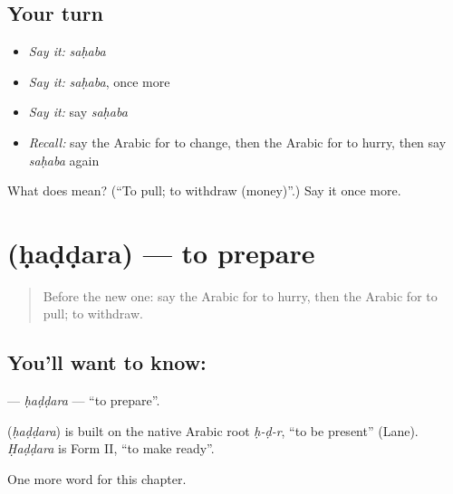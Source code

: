 \subsection*{Your turn}
\begin{itemize}
\raggedright
  \item \emph{Say it:} \emph{saḥaba}
  \item \emph{Say it:} \emph{saḥaba}, once more
  \item \emph{Say it:} say \emph{saḥaba}
  \item \emph{Recall:} say the Arabic for to change, then the Arabic for to hurry, then say \emph{saḥaba} again
\end{itemize}

\begin{tcolorbox}[breakable,colback=teal!4,colframe=teal!35!black,title={Before you move on}]
What does  mean? (\textquotedblleft{}To pull; to withdraw (money)\textquotedblright{}.) Say it once more.
\end{tcolorbox}
\section[\texorpdfstring{\ar{حضر} (ḥaḍḍara)}{حضر (ḥaḍḍara)}]{ (ḥaḍḍara) — to prepare}

\label{lesson:AR-C225-haddara}



\begin{quote}
Before the new one: say the Arabic for to hurry, then the Arabic for to pull; to withdraw.
\end{quote}

\subsection*{You'll want to know: }
\textbf{} — \emph{ḥaḍḍara} — \textquotedblleft{}to prepare\textquotedblright{}.

\begin{cousinweb}
\textbf{} (\emph{ḥaḍḍara}) is built on the native Arabic root \emph{ḥ-ḍ-r}, \textquotedblleft{}to be present\textquotedblright{} (Lane). \emph{Ḥaḍḍara} is Form II, \textquotedblleft{}to make ready\textquotedblright{}.
\end{cousinweb}

\begin{grammarlens}[title={What you've built}]
One more word for this chapter.
\end{grammarlens}

